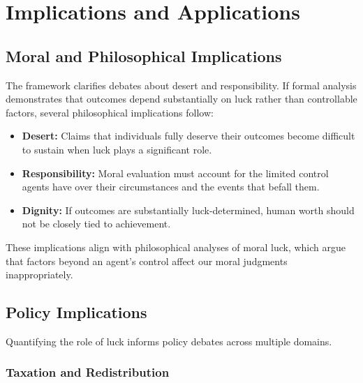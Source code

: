 \section{Implications and Applications}
\label{sec:implications}

\subsection{Moral and Philosophical Implications}

The framework clarifies debates about desert and responsibility. If formal
analysis demonstrates that outcomes depend substantially on luck rather than
controllable factors, several philosophical implications follow:

\begin{itemize}
  \item \textbf{Desert:} Claims that individuals fully deserve their
    outcomes become difficult to sustain when luck plays a significant
    role.

  \item \textbf{Responsibility:} Moral evaluation must account for the
    limited control agents have over their circumstances and the events
    that befall them.

  \item \textbf{Dignity:} If outcomes are substantially luck-determined,
    human worth should not be closely tied to achievement.
\end{itemize}

These implications align with philosophical analyses of moral luck,
which argue that factors beyond an agent's control affect our moral
judgments inappropriately.

\subsection{Policy Implications}

Quantifying the role of luck informs policy debates across multiple domains.

\subsubsection{Taxation and Redistribution}


